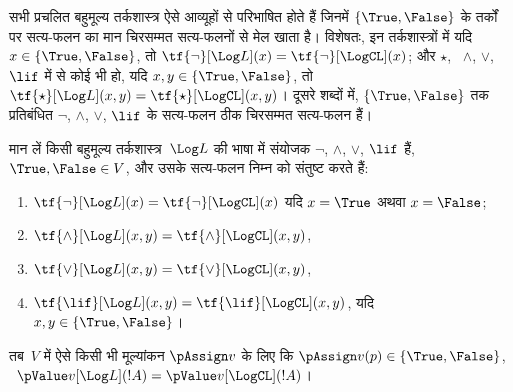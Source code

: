 \documentclass[../../../include/open-logic-section]{subfiles}
\begin{document}


सभी प्रचलित बहुमूल्य तर्कशास्त्र ऐसे आव्यूहों से परिभाषित होते हैं जिनमें
$\{\True, \False\}$ के तर्कों पर सत्य-फलन का मान चिरसम्मत सत्य-फलनों से मेल
खाता है। विशेषतः, इन तर्कशास्त्रों में यदि $x \in \{\True, \False\}$, तो
$\tf{\lnot}[\Log L](x) = \tf{\lnot}[\LogCL](x)$; और $\star$, ~$\land$,
$\lor$, $\lif$ में से कोई भी हो, यदि $x, y \in \{\True, \False\}$, तो
$\tf{\star}[\Log L](x,y) = \tf{\star}[\LogCL](x,y)$। दूसरे शब्दों में,
$\{\True,\False\}$ तक प्रतिबंधित $\lnot$, $\land$, $\lor$, $\lif$ के
सत्य-फलन ठीक चिरसम्मत सत्य-फलन हैं।

\begin{prop}
  मान लें किसी बहुमूल्य तर्कशास्त्र~$\Log L$ की भाषा में संयोजक $\lnot$,
  $\land$, $\lor$, $\lif$ हैं, $\True, \False \in V$, और उसके सत्य-फलन
  निम्न को संतुष्ट करते हैं:
  \begin{enumerate}
    \item{} $\tf{\lnot}[\Log L](x) = \tf{\lnot}[\LogCL](x)$ यदि $x =
    \True$ अथवा $x = \False$;
    \item{} $\tf{\land}[\Log L](x,y) = \tf{\land}[\LogCL](x,y)$,
    \item{} $\tf{\lor}[\Log L](x,y) = \tf{\lor}[\LogCL](x,y)$,
    \item{} $\tf{\lif}[\Log L](x,y) = \tf{\lif}[\LogCL](x,y)$,
    यदि $x, y \in \{\True, \False\}$।
  \end{enumerate}
  तब~$V$ में ऐसे किसी भी मूल्यांकन $\pAssign v$ के लिए कि $\pAssign v(p)
  \in \{\True,\False\}$, ~$\pValue v[\Log L](!A) = \pValue
  v[\LogCL](!A)$।
\end{prop}
\end{document}

